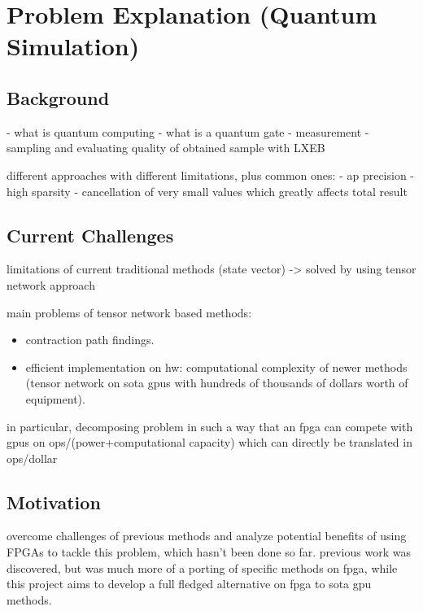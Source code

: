 \documentclass[12pt,oneside,a4paper]{article}
\begin{document}
\section{Problem Explanation (Quantum Simulation)}

\subsection{Background}
- what is quantum computing
- what is a quantum gate
- measurement
- sampling and evaluating quality of obtained sample with LXEB

different approaches with different limitations, plus common ones:
- ap precision
- high sparsity
- cancellation of very small values which greatly affects total result

\subsection{Current Challenges}
limitations of current traditional methods (state vector) -> solved by using tensor network approach



main problems of tensor network based methods:
\begin{itemize}
	\item contraction path findings.
	\item efficient implementation on hw: computational complexity of newer methods (tensor network on sota gpus with hundreds of thousands of dollars worth of equipment).
\end{itemize}

in particular, decomposing problem in such a way that an fpga can compete with gpus on ops/(power+computational capacity) which can directly be translated in ops/dollar

\subsection{Motivation}
overcome challenges of previous methods and analyze potential benefits of using FPGAs to tackle this problem, which hasn't been done so far. previous work was discovered, but was much more of a porting of specific methods on fpga, while this project aims to develop a full fledged alternative on fpga to sota gpu methods.
\end{document}
